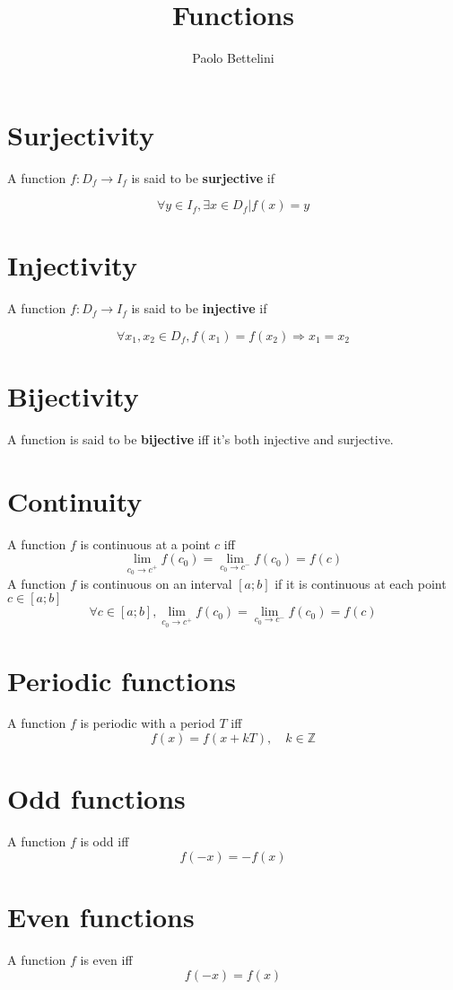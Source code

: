 \documentclass{article}
\title{Functions}
\author{Paolo Bettelini}
\date{}
\begin{document}
\maketitle
\tableofcontents
\pagebreak

\section{Surjectivity}

A function \(f:D_f \to I_f\) is said to be \textbf{surjective} if

\[
    \forall y \in I_f, \exists x \in D_f | f(x) = y
\]

\section{Injectivity}

A function \(f:D_f \to I_f\) is said to be \textbf{injective} if

\[
    \forall x_1, x_2 \in D_f, f(x_1) = f(x_2) \Rightarrow x_1 = x_2 
\]

\section{Bijectivity}

A function is said to be \textbf{bijective} iff it's both injective
and surjective.

\section{Continuity}

A function \(f\) is continuous at a point \(c\) iff
\[
    \lim_{c_0 \to c^+} f(c_0) = \lim_{c_0 \to c^-} f(c_0) = f(c)
\]
A function \(f\) is continuous on an interval \([a;b]\) if it is continuous at each point \(c \in [a;b]\)
\[
    \forall c \in [a;b],
    \lim_{c_0 \to c^+} f(c_0) = \lim_{c_0 \to c^-} f(c_0) = f(c)
\]

\section{Periodic functions}

A function \(f\) is periodic with a period \(T\) iff
\[
    f(x) = f(x + kT), \quad k \in \mathbb{Z}
\]

\section{Odd functions}

A function \(f\) is odd iff
\[
    f(-x) = -f(x)
\]

\section{Even functions}

A function \(f\) is even iff
\[
    f(-x) = f(x)
\]
\end{document}
